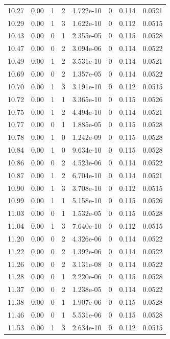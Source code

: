 \documentclass[preview]{standalone}
\begin{document}
{{{{\begin{tabular}{L{1.2cm}C{1.2cm} C{0.3cm}C{0.5cm} C{1.4cm}C{1.4cm} C{1.4cm}C{1.4cm}}
  10.27  &  0.00  & 1     &  2 &  1.722e-10  & 0  & 0.114 &  0.0521   \\ 
  10.29  &  0.00  & 1     &  3 &  1.622e-10  & 0  & 0.112 &  0.0515   \\ 
  10.43  &  0.00  & 0     &  1 &  2.355e-05  & 0  & 0.115 &  0.0528   \\ 
  10.47  &  0.00  & 0     &  2 &  3.094e-06  & 0  & 0.114 &  0.0522   \\ 
  10.49  &  0.00  & 1     &  2 &  3.531e-10  & 0  & 0.114 &  0.0521   \\ 
  10.69  &  0.00  & 0     &  2 &  1.357e-05  & 0  & 0.114 &  0.0522   \\ 
  10.70  &  0.00  & 1     &  3 &  3.191e-10  & 0  & 0.112 &  0.0515   \\ 
  10.72  &  0.00  & 1     &  1 &  3.365e-10  & 0  & 0.115 &  0.0526   \\ 
  10.75  &  0.00  & 1     &  2 &  4.494e-10  & 0  & 0.114 &  0.0521   \\ 
  10.77  &  0.00  & 0     &  1 &  1.885e-05  & 0  & 0.115 &  0.0528   \\ 
  10.78  &  0.00  & 1     &  0 &  1.242e-09  & 0  & 0.115 &  0.0528   \\ 
  10.84  &  0.00  & 1     &  0 &  9.634e-10  & 0  & 0.115 &  0.0528   \\ 
  10.86  &  0.00  & 0     &  2 &  4.523e-06  & 0  & 0.114 &  0.0522   \\ 
  10.87  &  0.00  & 1     &  2 &  6.704e-10  & 0  & 0.114 &  0.0521   \\ 
  10.90  &  0.00  & 1     &  3 &  3.708e-10  & 0  & 0.112 &  0.0515   \\ 
  10.99  &  0.00  & 1     &  1 &  5.158e-10  & 0  & 0.115 &  0.0526   \\ 
  11.03  &  0.00  & 0     &  1 &  1.532e-05  & 0  & 0.115 &  0.0528   \\ 
  11.04  &  0.00  & 1     &  3 &  7.640e-10  & 0  & 0.112 &  0.0515   \\ 
  11.20  &  0.00  & 0     &  2 &  4.326e-06  & 0  & 0.114 &  0.0522   \\ 
  11.22  &  0.00  & 0     &  2 &  1.392e-06  & 0  & 0.114 &  0.0522   \\ 
  11.26  &  0.00  & 0     &  2 &  3.131e-08  & 0  & 0.114 &  0.0522   \\ 
  11.28  &  0.00  & 0     &  1 &  2.220e-06  & 0  & 0.115 &  0.0528   \\ 
  11.37  &  0.00  & 0     &  2 &  1.238e-05  & 0  & 0.114 &  0.0522   \\ 
  11.38  &  0.00  & 0     &  1 &  1.907e-06  & 0  & 0.115 &  0.0528   \\ 
  11.46  &  0.00  & 0     &  1 &  5.531e-06  & 0  & 0.115 &  0.0528   \\ 
  11.53  &  0.00  & 1     &  3 &  2.634e-10  & 0  & 0.112 &  0.0515   \\ 
\hline 
\end{tabular} 

}}}}
\end{document}
